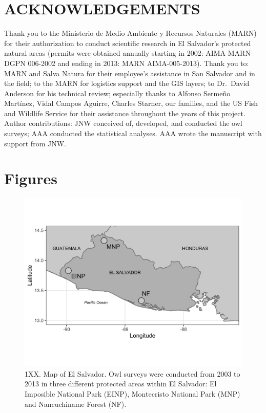 \documentclass[
]{article}
\begin{document}
\hypertarget{acknowledgements}{%
\section{ACKNOWLEDGEMENTS}\label{acknowledgements}}

Thank you to the Ministerio de Medio Ambiente y Recursos Naturales
(MARN) for their authorization to conduct scientific research in El
Salvador's protected natural areas (permits were obtained annually
starting in 2002: AIMA MARN-DGPN 006-2002 and ending in 2013: MARN
AIMA-005-2013). Thank you to: MARN and Salva Natura for their employee's
assistance in San Salvador and in the field; to the MARN for logistics
support and the GIS layers; to Dr.~David Anderson for his technical
review; especially thanks to Alfonso Sermeño Martínez, Vidal Campos
Aguirre, Charles Starner, our families, and the US Fish and Wildlife
Service for their assistance throughout the years of this project.
Author contributions: JNW conceived of, developed, and conducted the owl
surveys; AAA conducted the statistical analyses. AAA wrote the
manuscript with support from JNW.

\hypertarget{figures}{%
\section{Figures}\label{figures}}

\begin{figure}
\centering
\includegraphics{../output/figures/map-1.png}
\caption{1XX. Map of El Salvador. Owl surveys were conducted from 2003
to 2013 in three different protected areas within El Salvador: El
Imposible National Park (EINP), Montecristo National Park (MNP) and
Nancuchiname Forest (NF). \label{map}}
\end{figure}
\end{document}
